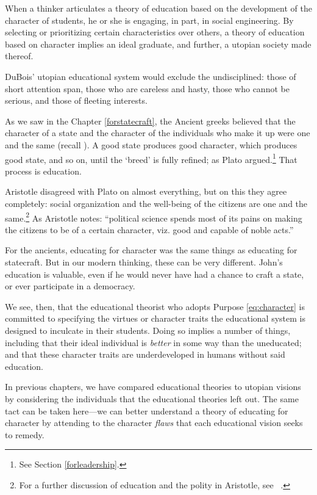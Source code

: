 When a thinker articulates a theory of education based on the development of the character of students, he or she is engaging, in part, in social engineering. By selecting or prioritizing certain characteristics over others, a theory of education based on character implies an ideal graduate, and further, a utopian society made thereof. 

DuBois' utopian educational system would exclude the undisciplined: those of short attention span, those who are careless and hasty, those who cannot be serious, and those of fleeting interests. 

As we saw in the Chapter \ref{forstatecraft}, the Ancient greeks believed that the character of a state and the character of the individuals who make it up were one and the same (recall ). A good state produces good character, which produces good state, and so on, until the `breed' is fully refined; as Plato argued.\footnote{See Section \ref{forleadership}.} That process is education. 

Aristotle disagreed with Plato on almost everything, but on this they agree completely: social organization and the well-being of the citizens are one and the same.\footnote{For a further discussion of education and the polity in Aristotle, see ~\citep{Reeve:1998tw}.} As Aristotle notes: ``political science spends most of its pains on making the citizens to be of a certain character, viz. good and capable of noble acts.'' ~\citep[1099b30--32]{Aristotle:1995uq}

For the ancients, educating for character was the same things as educating for statecraft. But in our modern thinking, these can be very different. John's education is valuable, even if he would never have had a chance to craft a state, or ever participate in a democracy. 

We see, then, that the educational theorist who adopts Purpose \ref{eq:character} is committed to specifying the virtues or character traits the educational system is designed to inculcate in their students. Doing so implies a number of things, including that their ideal individual is \emph{better} in some way than the uneducated; and that these character traits are underdeveloped in humans without said education. 

In previous chapters, we have compared educational theories to utopian visions by considering the individuals that the educational theories left out. The same tact can be taken here---we can better understand a theory of educating for character by attending to the character \emph{flaws} that each educational vision seeks to remedy. 

